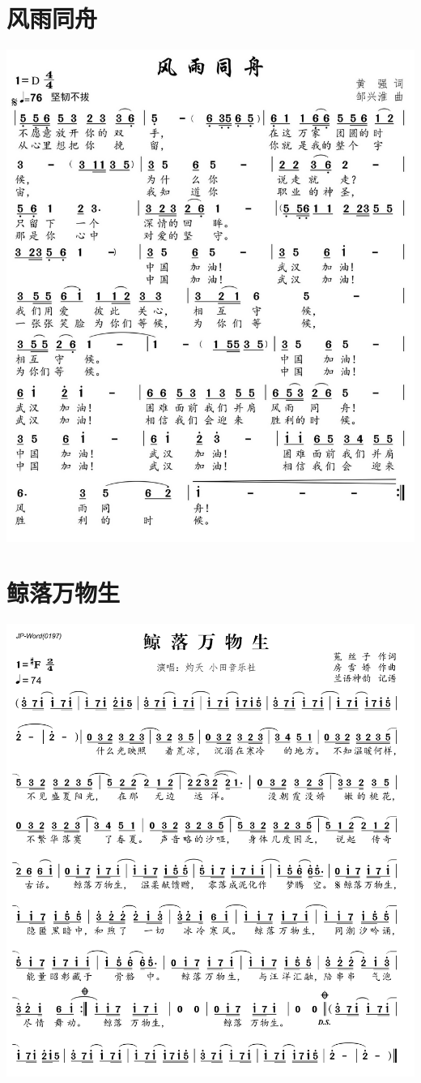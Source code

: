 \documentclass[cn,pad,twocol]{elegantbook}
\begin{document}
\section{风雨同舟} \includegraphics[width=\textwidth]{rpi400/20210206风雨同舟.png}
\section{鲸落万物生} \includegraphics[width=\textwidth]{rpi400/20210206鲸落万物生.png}
\end{document}
